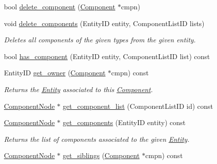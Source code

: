 \begin{DoxyCompactItemize}
bool \hyperlink{classnta_1_1ECS_ab24523ec53373bc159f67ee20d269975}{delete\+\_\+component} (\hyperlink{classnta_1_1Component}{Component} $\ast$cmpn)
\item 
\mbox{\label{classnta_1_1ECS_a283349003457513311fe9fe205e031bc}} 
void \hyperlink{classnta_1_1ECS_a283349003457513311fe9fe205e031bc}{delete\+\_\+components} (Entity\+ID entity, Component\+List\+ID lists)
\begin{DoxyCompactList}\small\item\em Deletes all components of the given types from the given entity. \end{DoxyCompactList}\item 
bool \hyperlink{classnta_1_1ECS_a370204d3b816a67fe22147f00d0c9447}{has\+\_\+component} (Entity\+ID entity, Component\+List\+ID list) const
\item 
\mbox{\label{classnta_1_1ECS_a132c523df15f7657cf4aa35973031a31}} 
Entity\+ID \hyperlink{classnta_1_1ECS_a132c523df15f7657cf4aa35973031a31}{get\+\_\+owner} (\hyperlink{classnta_1_1Component}{Component} $\ast$cmpn) const
\begin{DoxyCompactList}\small\item\em Returns the \hyperlink{classnta_1_1Entity}{Entity} associated to this \hyperlink{classnta_1_1Component}{Component}. \end{DoxyCompactList}\item 
\hyperlink{structnta_1_1utils_1_1LinkedNode}{Component\+Node} $\ast$ \hyperlink{classnta_1_1ECS_abd195033b6216d2dc8bf274a0ca82e4e}{get\+\_\+component\+\_\+list} (Component\+List\+ID id) const
\item 
\mbox{\label{classnta_1_1ECS_a5b2cc98462e1e510700ed7aab523cab1}} 
\hyperlink{structnta_1_1utils_1_1LinkedNode}{Component\+Node} $\ast$ \hyperlink{classnta_1_1ECS_a5b2cc98462e1e510700ed7aab523cab1}{get\+\_\+components} (Entity\+ID entity) const
\begin{DoxyCompactList}\small\item\em Returns the list of components associated to the given \hyperlink{classnta_1_1Entity}{Entity}. \end{DoxyCompactList}\item 
\mbox{\label{classnta_1_1ECS_a407bb99dd9dded2074fa9a32170e66f6}} 
\hyperlink{structnta_1_1utils_1_1LinkedNode}{Component\+Node} $\ast$ \hyperlink{classnta_1_1ECS_a407bb99dd9dded2074fa9a32170e66f6}{get\+\_\+siblings} (\hyperlink{classnta_1_1Component}{Component} $\ast$cmpn) const

\end{DoxyCompactItemize}
